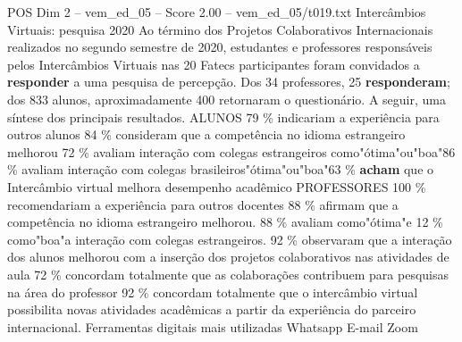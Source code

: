 \begin{textsample}{POS Dim 2 – vem\_ed\_05 – Score 2.00 – vem\_ed\_05/t019.txt}  \label{ex:f2_pos_092}
Intercâmbios Virtuais: pesquisa 2020 Ao término dos Projetos Colaborativos Internacionais realizados no segundo semestre de 2020, estudantes e professores responsáveis pelos Intercâmbios Virtuais nas 20 Fatecs participantes foram convidados a \textbf{responder} a uma pesquisa de percepção.
Dos 34 professores, 25 \textbf{responderam}; dos 833 alunos, aproximadamente 400 retornaram o questionário.
A seguir, uma síntese dos principais resultados.
ALUNOS 79 \% indicariam a experiência para outros alunos 84 \% consideram que a competência no idioma estrangeiro melhorou 72 \% avaliam interação com colegas estrangeiros como"ótima"ou"boa"86 \% avaliam interação com colegas brasileiros"ótima"ou"boa"63 \% \textbf{acham} que o Intercâmbio virtual melhora desempenho acadêmico PROFESSORES 100 \% recomendariam a experiência para outros docentes 88 \% afirmam que a competência no idioma estrangeiro melhorou. 88 \% avaliam como"ótima"e 12 \% como"boa"a interação com colegas estrangeiros. 92 \% observaram que a interação dos alunos melhorou com a inserção dos projetos colaborativos nas atividades de aula 72 \% concordam totalmente que as colaborações contribuem para pesquisas na área do professor 92 \% concordam totalmente que o intercâmbio virtual possibilita novas atividades acadêmicas a partir da experiência do parceiro internacional.
Ferramentas digitais mais utilizadas Whatsapp E-mail Zoom

\end{textsample}

